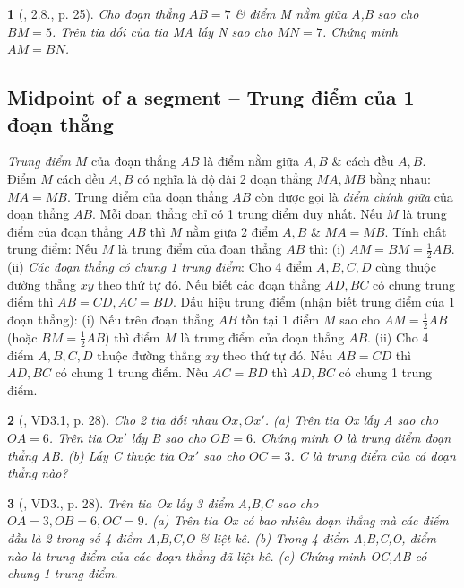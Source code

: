 \documentclass{article}
\newtheorem{baitoan}{}
\begin{document}
\begin{baitoan}[\cite{TLCT_THCS_Toan_6_hinh_hoc}, 2.8., p. 25]
	Cho đoạn thẳng $AB = 7$ \& điểm M nằm giữa A,B sao cho $BM = 5$. Trên tia đối của tia MA lấy N sao cho $MN = 7$. Chứng minh $AM = BN$.
\end{baitoan}

\subsection{Midpoint of a segment -- Trung điểm của 1 đoạn thẳng}
 \textit{Trung điểm} $M$ của đoạn thẳng $AB$ là điểm nằm giữa $A,B$ \& cách đều $A,B$. Điểm $M$ cách đều $A,B$ có nghĩa là độ dài 2 đoạn thẳng $MA,MB$ bằng nhau: $MA = MB$. Trung điểm của đoạn thẳng $AB$ còn được gọi là \textit{điểm chính giữa} của đoạn thẳng $AB$. Mỗi đoạn thẳng chỉ có 1 trung điểm duy nhất.  Nếu $M$ là trung điểm của đoạn thẳng $AB$ thì $M$ nằm giữa 2 điểm $A,B$ \& $MA = MB$.  {\sf Tính chất trung điểm}: Nếu $M$ là trung điểm của đoạn thẳng $AB$ thì: (i) $AM = BM = \frac{1}{2}AB$. (ii) \textit{Các đoạn thẳng có chung 1 trung điểm}: Cho 4 điểm $A,B,C,D$ cùng thuộc đường thẳng $xy$ theo thứ tự đó. Nếu biết các đoạn thẳng $AD,BC$ có chung trung điểm thì $AB = CD,AC = BD$.  {\sf Dấu hiệu trung điểm (nhận biết trung điểm của 1 đoạn thẳng)}: (i) Nếu trên đoạn thẳng $AB$ tồn tại 1 điểm $M$ sao cho $AM = \frac{1}{2}AB$ (hoặc $BM = \frac{1}{2}AB$) thì điểm $M$ là trung điểm của đoạn thẳng $AB$. (ii) Cho 4 điểm $A,B,C,D$ thuộc đường thẳng $xy$ theo thứ tự đó. Nếu $AB = CD$ thì $AD,BC$ có chung 1 trung điểm. Nếu $AC = BD$ thì $AD,BC$ có chung 1 trung điểm.

\begin{baitoan}[\cite{TLCT_THCS_Toan_6_hinh_hoc}, VD3.1, p. 28]
	Cho 2 tia đối nhau $Ox,Ox'$. (a) Trên tia Ox lấy A sao cho $OA = 6$. Trên tia $Ox'$ lấy B sao cho $OB = 6$. Chứng minh O là trung điểm đoạn thẳng AB. (b) Lấy C thuộc tia $Ox'$ sao cho $OC = 3$. C là trung điểm của cá đoạn thẳng nào?
\end{baitoan}

\begin{baitoan}[\cite{TLCT_THCS_Toan_6_hinh_hoc}, VD3., p. 28]
	Trên tia Ox lấy 3 điểm A,B,C sao cho $OA = 3,OB = 6,OC = 9$. (a) Trên tia Ox có bao nhiêu đoạn thẳng mà các điểm đầu là 2 trong số 4 điểm A,B,C,O \& liệt kê. (b) Trong 4 điểm A,B,C,O, điểm nào là trung điểm của các đoạn thẳng đã liệt kê. (c) Chứng minh OC,AB có chung 1 trung điểm.
\end{baitoan}
\end{document}
